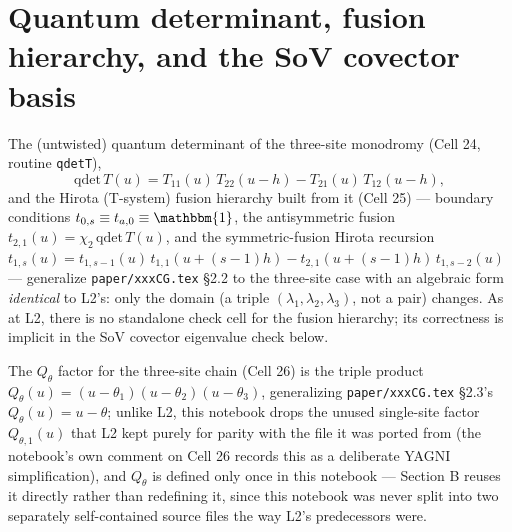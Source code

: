 \documentclass[11pt]{article}
\newcommand{\qth}{Q_\theta}
\begin{document}
\section{Quantum determinant, fusion hierarchy, and the SoV covector basis}
\label{sec:sov}

The (untwisted) quantum determinant of the three-site monodromy (Cell 24, routine \texttt{qdetT}),
\begin{equation}
  \mathrm{qdet}\,T(u) = T_{11}(u)\,T_{22}(u-h) - T_{21}(u)\,T_{12}(u-h),
  \label{eq:qdet}
\end{equation}
and the Hirota (T-system) fusion hierarchy built from it (Cell 25) --- boundary conditions
$t_{0,s}\equiv t_{a,0}\equiv\mathbbm{1}$, the antisymmetric fusion
$t_{2,1}(u)=\chi_2\,\mathrm{qdet}\,T(u)$, and the symmetric-fusion Hirota recursion
$t_{1,s}(u)=t_{1,s-1}(u)\,t_{1,1}(u+(s-1)h)-t_{2,1}(u+(s-1)h)\,t_{1,s-2}(u)$ --- generalize
\texttt{paper/xxxCG.tex} \S2.2 to the three-site case with an algebraic form \emph{identical} to
L2's: only the domain (a triple $(\lambda_1,\lambda_2,\lambda_3)$, not a pair) changes. As at L2,
there is no standalone check cell for the fusion hierarchy; its correctness is implicit in the SoV
covector eigenvalue check below.

The $\qth$ factor for the three-site chain (Cell 26) is the triple product
$\qth(u)=(u-\theta_1)(u-\theta_2)(u-\theta_3)$, generalizing \texttt{paper/xxxCG.tex} \S2.3's
$\qth(u)=u-\theta$; unlike L2, this notebook drops the unused single-site factor $Q_{\theta,1}(u)$
that L2 kept purely for parity with the file it was ported from (the notebook's own comment on Cell
26 records this as a deliberate YAGNI simplification), and $\qth$ is defined only once in this
notebook --- Section B reuses it directly rather than redefining it, since this notebook was never
split into two separately self-contained source files the way L2's predecessors were.
\end{document}
